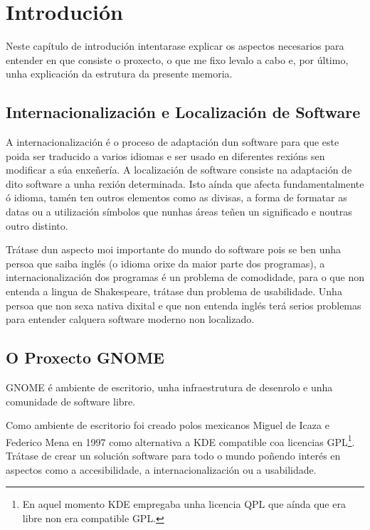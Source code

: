 %
%

\chapter[Introducción]{Introdución}

Neste capítulo de introdución intentarase explicar os aspectos necesarios para entender en que consiste o proxecto, o que me fixo levalo a cabo e, por último, unha explicación da estrutura da presente memoria.

\section{Internacionalización e Localización de Software}
A internacionalización é o proceso de adaptación dun software para que este poida ser traducido a varios idiomas e ser usado en diferentes rexións sen modificar a súa enxeñería. A localización de software consiste na adaptación de dito software a unha rexión determinada. Isto aínda que afecta fundamentalmente ó idioma, tamén ten outros elementos como as divisas, a forma de formatar as datas ou a utilización símbolos que nunhas áreas teñen un significado e noutras outro distinto.

Trátase dun aspecto moi importante do mundo do software pois se ben unha persoa que saiba inglés (o idioma orixe da maior parte dos programas), a internacionalización dos programas é un problema de comodidade, para o que non entenda a lingua de Shakespeare, trátase dun problema de usabilidade. Unha persoa que non sexa nativa dixital e que non entenda inglés terá serios problemas para entender calquera software moderno non localizado.

\section{O Proxecto GNOME}
GNOME é ambiente de escritorio, unha infraestrutura de desenrolo e unha comunidade de software libre.

Como ambiente de escritorio foi creado polos mexicanos Miguel de Icaza e Federico Mena en 1997 como alternativa a KDE compatible coa licencias GPL\footnote{En aquel momento KDE empregaba unha licencia QPL que aínda que era libre non era compatible GPL.}. Trátase de crear un solución software para todo o mundo poñendo interés en aspectos como a accesibilidade, a internacionalización ou a usabilidade.

